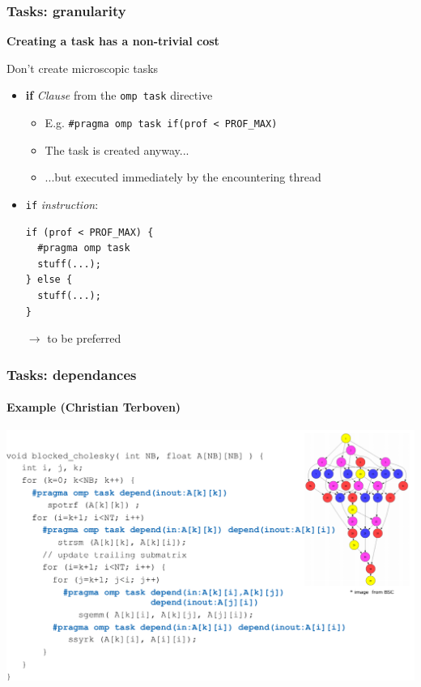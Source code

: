 \documentclass{beamer}
\begin{document}
\begin{frame}[fragile=singleslide]
  \frametitle{Tasks: granularity}

  \textbf{Creating a task has a non-trivial cost}

  \bigskip

  \begin{exampleblock}{Don't create microscopic tasks}
    \begin{itemize}
    \item \textbf{if} \emph{Clause} from the \texttt{omp task} directive
      \begin{itemize}
      \item E.g. \texttt{\#pragma omp task if(prof < PROF\_MAX)}
      \item The task is \alert{created anyway}...
      \item ...but executed immediately by the encountering thread
      \end{itemize}

      \medskip

    \item \texttt{if} \emph{instruction}:
\begin{verbatim}
if (prof < PROF_MAX) {
  #pragma omp task
  stuff(...);
} else {
  stuff(...);
}
\end{verbatim}
      \item[$\rightarrow$] to be preferred
    \end{itemize}
  \end{exampleblock}
  
\end{frame}


\begin{frame}
  \frametitle{Tasks: dependances}
  \framesubtitle{Example (Christian Terboven)}
  
  \includegraphics[width=\textwidth]{block_cholesky_tasking}
  
\end{frame}
\end{document}
